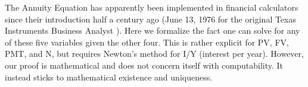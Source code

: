 %
%
%
%
%
%
%
%
%
%

The Annuity Equation has apparently been implemented in financial calculators since their introduction half a century ago (June 13, 1976 for the original Texas Instruments Business Analyst \cite{TI-CL207A-1977}).
Here we formalize the fact one can solve for any of these five variables given the other four. This is rather explicit for PV, FV, PMT, and N, but requires Newton's method for I/Y (interest per year). However, our proof is mathematical and does not concern itself with computability. It instead sticks to mathematical existence and uniqueness.



